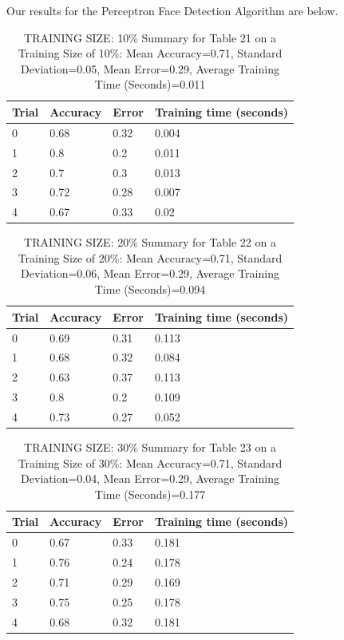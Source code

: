 \documentclass{article}
\begin{document}
Our results for the Perceptron Face Detection Algorithm are below.

\begin{table}[H]

\centering
{\begin{tabular}{||p{1cm}|p{1.8cm}|p{1.8cm}|p{3cm}||}
 \hline
Trial & Accuracy & Error & Training time (seconds) \\ [0.5ex] 
 \hline\hline
   0 & 0.68 & 0.32 & 0.004\\
\hline
   1 & 0.8 & 0.2 & 0.011\\
\hline
   2 & 0.7 & 0.3 & 0.013\\
\hline
   3 & 0.72 & 0.28 & 0.007\\
\hline
   4 & 0.67 & 0.33 & 0.02\\
\hline
\end{tabular}}
\caption{TRAINING SIZE: 10\% \newline Summary for Table 21 on a Training Size of 10\%: Mean Accuracy=0.71, Standard Deviation=0.05, Mean Error=0.29, Average Training Time (Seconds)=0.011}
\end{table} 

\begin{table}[H]

\centering
{\begin{tabular}{||p{1cm}|p{1.8cm}|p{1.8cm}|p{3cm}||}
 \hline
Trial & Accuracy & Error & Training time (seconds) \\ [0.5ex] 
 \hline\hline
   0 & 0.69 & 0.31 & 0.113\\
\hline
   1 & 0.68 & 0.32 & 0.084\\
\hline
   2 & 0.63 & 0.37 & 0.113\\
\hline
   3 & 0.8 & 0.2 & 0.109\\
\hline
   4 & 0.73 & 0.27 & 0.052\\
\hline
\end{tabular}}
\caption{TRAINING SIZE: 20\% \newline Summary for Table 22 on a Training Size of 20\%: Mean Accuracy=0.71, Standard Deviation=0.06, Mean Error=0.29, Average Training Time (Seconds)=0.094}
\end{table} 

\begin{table}[H]

\centering
{\begin{tabular}{||p{1cm}|p{1.8cm}|p{1.8cm}|p{3cm}||}
 \hline
Trial & Accuracy & Error & Training time (seconds) \\ [0.5ex] 
 \hline\hline
   0 & 0.67 & 0.33 & 0.181\\
\hline
   1 & 0.76 & 0.24 & 0.178\\
\hline
   2 & 0.71 & 0.29 & 0.169\\
\hline
   3 & 0.75 & 0.25 & 0.178\\
\hline
   4 & 0.68 & 0.32 & 0.181\\
\hline
\end{tabular}}
\caption{TRAINING SIZE: 30\% \newline Summary for Table 23 on a Training Size of 30\%: Mean Accuracy=0.71, Standard Deviation=0.04, Mean Error=0.29, Average Training Time (Seconds)=0.177}
\end{table} 
\end{document}
